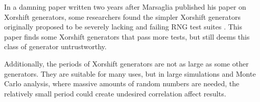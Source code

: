 In a damning paper written two years after Marsaglia published his paper on Xorshift generators, some researchers found the simpler Xorshift generators originally proposed to be severely lacking and failing RNG test suites \cite{panneton2005xorshift}. This paper finds some Xorshift generators that pass more tests, but still deems this class of generator untrustworthy.

Additionally, the periods of Xorshift generators are not as large as some other generators. They are suitable for many uses, but in large simulations and Monte Carlo analysis, where massive amounts of random numbers are needed, the relatively small period could create undesired correlation affect results.
